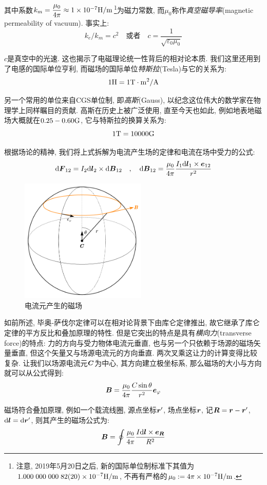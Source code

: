 其中系数$k_m=\dfrac{\mu_0}{4\pi}\approx 1\times 10^{-7}{\rm H/m}$\footnote{注意, 2019年5月20日之后, 新的国际单位制标准下其值为$1.000\;000\;000\;82(20)\times 10^{-7}{\rm H/m}$, 不再有严格的$\mu_0:=4\pi\times 10^{-7}{\rm H/m}$.}为磁力常数, 而$\mu_0$称作\emph{真空磁导率}(magnetic permeability of vacuum). 事实上:
\[k_e/k_m=c^2\quad \text{或者}\quad c=\frac{1}{\sqrt{\varepsilon_0\mu_0}}\]

$c$是真空中的光速. 这也揭示了电磁理论统一性背后的相对论本质. 我们这里还用到了电感的国际单位亨利, 而磁场的国际单位\emph{特斯拉}(Tesla)与它的关系为:
\[1{\rm H}=1{\rm T\cdot m^2/A}\]

另一个常用的单位来自CGS单位制, 即\emph{高斯}(Gauss), 以纪念这位伟大的数学家在物理学上同样瞩目的贡献. 高斯在历史上被广泛使用, 直至今天也如此, 例如地表地磁场大概就在$0.25-0.60{\rm G}$, 它与特斯拉的换算关系为:
\[1{\rm T}=10000{\rm G}\]

根据场论的精神, 我们将上式拆解为电流产生场的定律和电流在场中受力的公式:
\[\textrm{d} \boldsymbol{F}_{12}=I_2\textrm{d} \boldsymbol{l}_2\times \textrm{d} \boldsymbol{B}_{12}\quad ,\quad \textrm{d} \boldsymbol{B}_{12}=\frac{\mu_0}{4\pi}\frac{I_1\textrm{d} \boldsymbol{l}_1\times \boldsymbol{e}_{12}}{r^2}\]

\begin{figure}
\centering
\includegraphics[width=6cm]{image/7-4-6.png}
\caption{电流元产生的磁场}
\end{figure}
如前所述, 毕奥-萨伐尔定律可以在相对论背景下由库仑定律推出, 故它继承了库仑定律的平方反比和叠加原理的特性. 但是它突出的特点是具有\emph{横向力}(transverse force)的特点: 力的方向与受力物体电流元垂直, 也与另一个只依赖于场源的磁场矢量垂直, 但这个矢量又与场源电流元的方向垂直. 两次叉乘这让力的计算变得比较复杂. 让我们以场源电流元$\boldsymbol{C}$为中心, 其方向建立极坐标系, 那么磁场的大小与方向就可以从公式得到:
\[\boldsymbol{B}=\frac{\mu_0}{4\pi}\frac{C\sin\theta}{r^2}\boldsymbol{e}_\varphi \]

磁场符合叠加原理, 例如一个载流线圈, 源点坐标$\boldsymbol{r}'$, 场点坐标$\boldsymbol{r}$, 记$\boldsymbol{R}=\boldsymbol{r}-\boldsymbol{r}'$, $\textrm{d} \boldsymbol{l}=\textrm{d} \boldsymbol{r}'$, 则其产生的磁场公式为:
\[\boldsymbol{B}=\oint \frac{\mu_0}{4\pi}\frac{I\textrm{d} \boldsymbol{l}\times \boldsymbol{e}_{\boldsymbol{R}}}{R^2}\]



